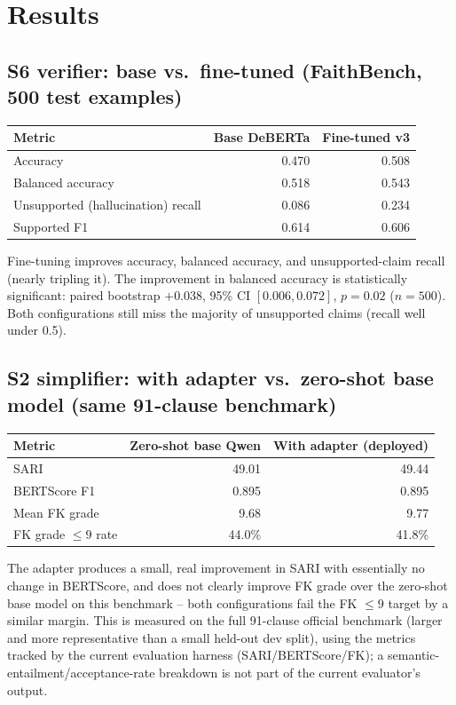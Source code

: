 \documentclass[11pt]{article}
\begin{document}
\section{Results}

\subsection{S6 verifier: base vs.\ fine-tuned (FaithBench, 500 test examples)}
\begin{table}[h!]
\centering
\begin{tabular}{lrr}
\toprule
Metric & Base DeBERTa & Fine-tuned v3 \\
\midrule
Accuracy & 0.470 & 0.508 \\
Balanced accuracy & 0.518 & 0.543 \\
Unsupported (hallucination) recall & 0.086 & 0.234 \\
Supported F1 & 0.614 & 0.606 \\
\bottomrule
\end{tabular}
\end{table}
\noindent Fine-tuning improves accuracy, balanced accuracy, and unsupported-claim recall (nearly
tripling it). The improvement in balanced accuracy is statistically significant: paired bootstrap
$+0.038$, 95\% CI $[0.006, 0.072]$, $p=0.02$ ($n=500$). Both configurations still miss the
majority of unsupported claims (recall well under 0.5).

\subsection{S2 simplifier: with adapter vs.\ zero-shot base model (same 91-clause benchmark)}
\begin{table}[h!]
\centering
\begin{tabular}{lrr}
\toprule
Metric & Zero-shot base Qwen & With adapter (deployed) \\
\midrule
SARI & 49.01 & 49.44 \\
BERTScore F1 & 0.895 & 0.895 \\
Mean FK grade & 9.68 & 9.77 \\
FK grade $\leq 9$ rate & 44.0\% & 41.8\% \\
\bottomrule
\end{tabular}
\end{table}
\noindent The adapter produces a small, real improvement in SARI with essentially no change in
BERTScore, and does not clearly improve FK grade over the zero-shot base model on this benchmark
-- both configurations fail the FK $\leq 9$ target by a similar margin. This is measured on the
full 91-clause official benchmark (larger and more representative than a small held-out dev
split), using the metrics tracked by the current evaluation harness (SARI/BERTScore/FK); a
semantic-entailment/acceptance-rate breakdown is not part of the current evaluator's output.
\end{document}
